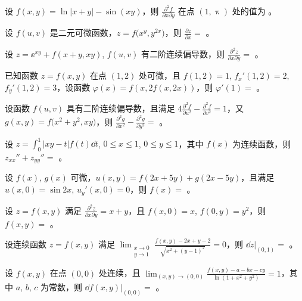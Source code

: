 \begin{ti}
	设 $f(x,y) = \ln|x + y| - \sin(xy)$，则 $\frac{\partial^2f}{\partial x \partial y}$ 在点 $(1,\uppi)$ 处的值为 \hua。
\end{ti}

\begin{ti}
	设 $f(u,v)$ 是二元可微函数，$z = f\bigl( x^y,y^{2x} \bigr)$，则 $\frac{\partial z}{\partial x} = $ \hua。
\end{ti}

\begin{ti}
	设 $z = \ee^{xy} + f(x+y,xy)$, $f(u,v)$ 有二阶连续偏导数，则 $\frac{\partial^2z}{\partial x \partial y} = $ \hua。
\end{ti}

\begin{ti}
	已知函数 $z = f(x,y)$ 在点 $(1,2)$ 处可微，且 $f(1,2) = 1$, $f_x'(1,2) = 2$, $f_y'(1,2) = 3$，设函数 $\varphi(x) = f(x,2 f(x,2x))$，则 $\varphi'(1) = $ \hua。
\end{ti}

\begin{ti}
	设函数 $f(u,v)$ 具有二阶连续偏导数，且满足 $4 \frac{\partial^2f}{\partial u^2} - \frac{\partial^2f}{\partial v^2} = 1$，又 $g(x,y) = f\bigl(x^2 + y^2,xy \bigr)$，则 $\frac{\partial^2g}{\partial x^2} - \frac{\partial^2g}{\partial y^2} = $ \hua。
\end{ti}

\begin{ti}
	设 $z = \int_0^1 |xy - t| f(t) \dd{t}$, $0 \leq x \leq 1$, $0 \leq y \leq 1$，其中 $f(x)$ 为连续函数，则 $z_{xx}'' + z_{yy}'' = $ \hua。
\end{ti}

\begin{ti}
	设 $f(x)$, $g(x)$ 可微，$u(x,y) = f(2x+5y) + g(2x-5y)$，且满足 $u(x,0) = \sin 2x$, $u_y'(x,0) = 0$，则 $f(x) = $ \hua。
\end{ti}

\begin{ti}
	设 $z = f(x,y)$ 满足 $\frac{\partial^2z}{\partial x \partial y} = x + y$，且 $f(x,0) = x$, $f(0,y) = y^2$，则 $f(x,y) = $ \hua。
\end{ti}

\begin{ti}
	设连续函数 $z = f(x,y)$ 满足 $\lim_{\substack{x \to 0\\y \to 1}} \frac{f(x,y) - 2x + y - 2}{\sqrt{x^2 + (y-1)^2}} = 0$，则 $\dd{z}|_{(0,1)} = $ \hua。
\end{ti}

\begin{ti}
	设 $f(x,y)$ 在点 $(0,0)$ 处连续，且 $\lim_{(x,y) \to (0,0)} \frac{f(x,y) - a - bx - cy}{\ln(1 + x^2 + y^2)} = 1$，其中 $a$, $b$, $c$ 为常数，则 $\dd{f(x,y)}|_{(0,0)} = $ \hua。
\end{ti}

